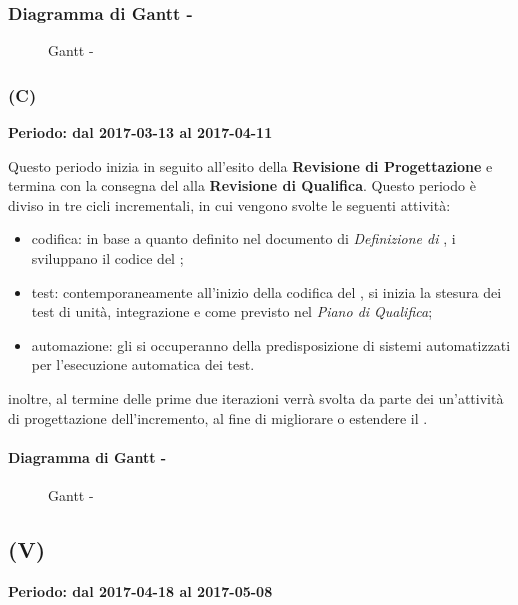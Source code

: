 \documentclass[./PianoDiProgetto.tex]{subfiles}
\begin{document}
  \subsubsection{Diagramma di Gantt - \PerPD}
    \begin{figure}[!h]
    \centering
    \caption{Gantt - \PerPD}
    \end{figure}

  \subsubsection{\PerC{} (C)}
  \textbf{Periodo: dal 2017-03-13 al 2017-04-11}

  Questo periodo inizia in seguito all'esito della \textbf{Revisione di Progettazione} e termina con la consegna del  alla \textbf{Revisione di Qualifica}. Questo periodo è diviso in tre cicli incrementali, in cui vengono svolte le seguenti attività:
  \begin{itemize}
    \item codifica: in base a quanto definito nel documento di \textit{Definizione di }, i \PRP{} sviluppano il codice del  ;
    \item test: contemporaneamente all'inizio della codifica del , si inizia la stesura dei test di unità, integrazione e  come previsto nel \textit{Piano di Qualifica};
    \item automazione: gli \AMMP{} si occuperanno della predisposizione di sistemi automatizzati per l'esecuzione automatica dei test.
  \end{itemize}
  inoltre, al termine delle prime due iterazioni verrà svolta da parte dei \PJP un'attività di progettazione dell'incremento, al fine di migliorare o estendere il .

  \paragraph{Diagramma di Gantt - \PerC}
    \begin{figure}[!h]
    \centering
    \caption{Gantt - \PerC}
    \end{figure}

  \subsection{\PerV (V)}
  \textbf{Periodo: dal 2017-04-18 al 2017-05-08}
\end{document}
